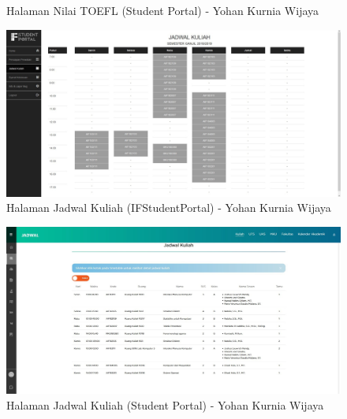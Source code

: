 \begin{itemize}
\begin{enumerate}
\begin{figure}[H]
			\caption{Halaman Nilai TOEFL (Student Portal) - Yohan Kurnia Wijaya}
			\label{fig:2017_1_toefl_studentportal}
		\end{figure}
		\begin{figure}[H]
			\centering
			\includegraphics[scale=0.325]{Gambar/HasilPengujian/2017_1_jadwal_kuliah_ifstudentportal}
			\caption{Halaman Jadwal Kuliah (IFStudentPortal) - Yohan Kurnia Wijaya}
			\label{fig:2017_1_jadwal_kuliah_ifstudentportal}
		\end{figure}
		\begin{figure}[H]
			\centering
			\includegraphics[scale=0.325]{Gambar/HasilPengujian/2017_1_jadwal_kuliah_studentportal}
			\caption{Halaman Jadwal Kuliah (Student Portal) - Yohan Kurnia Wijaya}
			\label{fig:2017_1_jadwal_kuliah_studentportal}
		\end{figure}

\end{enumerate}
\end{itemize}
